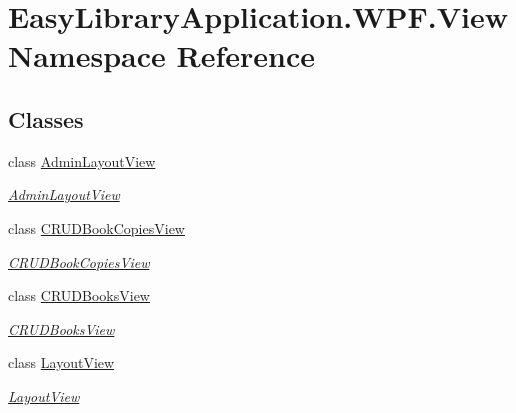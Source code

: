 \hypertarget{namespace_easy_library_application_1_1_w_p_f_1_1_view}{}\section{Easy\+Library\+Application.\+W\+P\+F.\+View Namespace Reference}
\label{namespace_easy_library_application_1_1_w_p_f_1_1_view}
\subsection*{Classes}
\begin{DoxyCompactItemize}
\item 
class \mbox{\hyperlink{class_easy_library_application_1_1_w_p_f_1_1_view_1_1_admin_layout_view}{Admin\+Layout\+View}}
\begin{DoxyCompactList}\small\item\em \mbox{\hyperlink{class_easy_library_application_1_1_w_p_f_1_1_view_1_1_admin_layout_view}{Admin\+Layout\+View}} \end{DoxyCompactList}\item 
class \mbox{\hyperlink{class_easy_library_application_1_1_w_p_f_1_1_view_1_1_c_r_u_d_book_copies_view}{C\+R\+U\+D\+Book\+Copies\+View}}
\begin{DoxyCompactList}\small\item\em \mbox{\hyperlink{class_easy_library_application_1_1_w_p_f_1_1_view_1_1_c_r_u_d_book_copies_view}{C\+R\+U\+D\+Book\+Copies\+View}} \end{DoxyCompactList}\item 
class \mbox{\hyperlink{class_easy_library_application_1_1_w_p_f_1_1_view_1_1_c_r_u_d_books_view}{C\+R\+U\+D\+Books\+View}}
\begin{DoxyCompactList}\small\item\em \mbox{\hyperlink{class_easy_library_application_1_1_w_p_f_1_1_view_1_1_c_r_u_d_books_view}{C\+R\+U\+D\+Books\+View}} \end{DoxyCompactList}\item 
class \mbox{\hyperlink{class_easy_library_application_1_1_w_p_f_1_1_view_1_1_layout_view}{Layout\+View}}
\begin{DoxyCompactList}\small\item\em \mbox{\hyperlink{class_easy_library_application_1_1_w_p_f_1_1_view_1_1_layout_view}{Layout\+View}} \end{DoxyCompactList}\item 

\end{DoxyCompactItemize}
